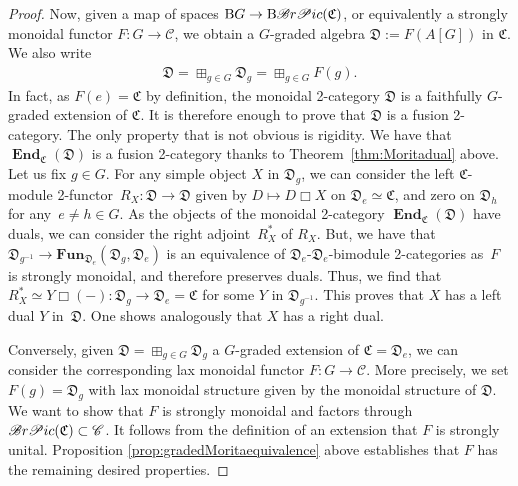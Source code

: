 \documentclass[11pt]{article}
\numberwithin{equation}{section}
\numberwithin{equation}{section}
\begin{document}
\begin{proof}
Now, given a map of spaces $\mathrm{B}G\rightarrow \mathrm{B}\mathscr{B}{\rm r}\mathscr{P}{\rm ic}(\mathfrak{C})$, or equivalently a strongly monoidal functor $F\colon G\rightarrow \mathscr{C}$, we obtain a $G$-graded algebra $\mathfrak{D}:=F(A[G])$ in $\mathfrak{C}$. We also write
\begin{gather*}
\mathfrak{D}=\boxplus_{g\in G}\mathfrak{D}_g=\boxplus_{g\in G}F(g).
\end{gather*}
 In fact, as $F(e) = \mathfrak{C}$ by definition, the monoidal 2-category $\mathfrak{D}$ is a faithfully $G$-graded extension of $\mathfrak{C}$. It is therefore enough to prove that $\mathfrak{D}$ is a fusion 2-category. The only property that is not obvious is rigidity. We have that $\mathbf{\operatorname{End}}_{\mathfrak{C}}(\mathfrak{D})$ is a fusion 2-category thanks to Theorem~\ref{thm:Moritadual} above. Let us fix $g\in G$. For any simple object $X$ in $\mathfrak{D}_g$, we can consider the left $\mathfrak{C}$-module 2-functor~${R_X\colon \mathfrak{D}\rightarrow \mathfrak{D}}$ given by $D\mapsto D\Box X$ on ${\mathfrak{D}_e\simeq \mathfrak{C}}$, and zero on $\mathfrak{D}_h$ for any~${e\neq h\in G}$. As the objects of the monoidal 2-category $\mathbf{\operatorname{End}}_{\mathfrak{C}}(\mathfrak{D})$ have duals, we can consider the right adjoint~$R_X^*$ of $R_X$. But, we have that $\mathfrak{D}_{g^{-1}}\rightarrow \mathbf{Fun}_{\mathfrak{D}_e}(\mathfrak{D}_g,\mathfrak{D}_e)$ is an equivalence of $\mathfrak{D}_e$-$\mathfrak{D}_e$-bimodule 2-categories as~$F$ is strongly monoidal, and therefore preserves duals. Thus, we find that ${R_X^*\simeq Y\Box (-)\colon \mathfrak{D}_g\rightarrow \mathfrak{D}_e=\mathfrak{C}}$ for some $Y$ in $\mathfrak{D}_{g^{-1}}$. This proves that $X$ has a left dual $Y$ in~$\mathfrak{D}$. One shows analogously that $X$ has a right dual.

Conversely, given $\mathfrak{D}=\boxplus_{g\in G}\mathfrak{D}_g$ a $G$-graded extension of $\mathfrak{C}= \mathfrak{D}_e$, we can consider the corresponding lax monoidal functor $F\colon G\rightarrow \mathscr{C}$. More precisely, we set $F(g) = \mathfrak{D}_g$ with lax monoidal structure given by the monoidal structure of $\mathfrak{D}$. We want to show that $F$ is strongly monoidal and factors through $\mathscr{B}{\rm r}\mathscr{P}{\rm ic}(\mathfrak{C})\subset \mathscr{C}$. It follows from the definition of an extension that $F$ is strongly unital. Proposition \ref{prop:gradedMoritaequivalence} above establishes that $F$ has the remaining desired properties.
\end{proof}
\end{document}
